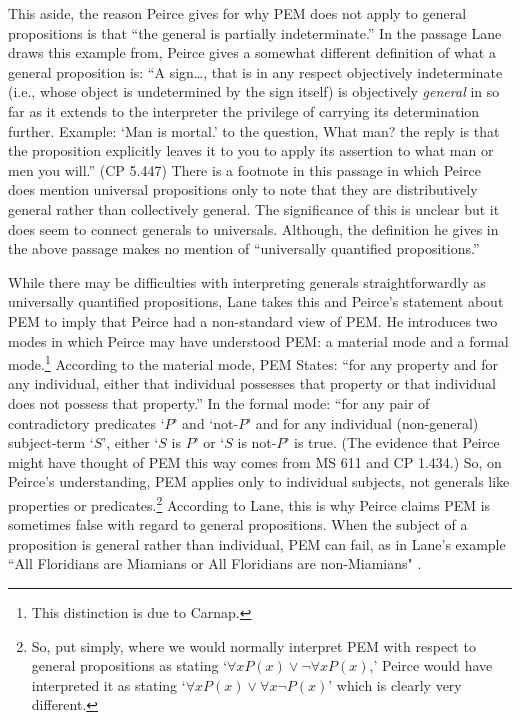 This aside, the reason Peirce gives for why PEM does not apply to general propositions is that ``the general is partially indeterminate.'' In the passage Lane draws this example from, Peirce gives a somewhat different definition of what a general proposition is: ``A sign\dots, that is in any respect objectively indeterminate (i.e., whose object is undetermined by the sign itself) is objectively \textit{general} in so far as it extends to the interpreter the privilege of carrying its determination further. Example: `Man is mortal.' to the question, What man? the reply is that the proposition explicitly leaves it to you to apply its assertion to what man or men you will.'' (CP 5.447) There is a footnote in this passage in which Peirce does mention universal propositions only to note that they are distributively general rather than collectively general. The significance of this is unclear but it does seem to connect generals to universals. Although, the definition he gives in the above passage makes no mention of ``universally quantified propositions.'' 

While there may be difficulties with interpreting generals straightforwardly as universally quantified propositions, Lane takes this and Peirce's statement about PEM to imply that Peirce had a non-standard view of PEM. He introduces two modes in which Peirce may have understood PEM: a material mode and a formal mode.\footnote{This distinction is due to Carnap.} According to the material mode, PEM States: ``for any property and for any individual, either that individual possesses that property or that individual does not possess that property.'' In the formal mode: ``for any pair of contradictory predicates `$P$' and `not-$P$' and for any individual (non-general) subject-term `$S$', either `$S$ is $P$' or `$S$ is not-$P$' is true. (The evidence that Peirce might have thought of PEM this way comes from MS 611 and CP 1.434.) So, on Peirce's understanding, PEM applies only to individual subjects, not generals like properties or predicates.\footnote{So, put simply, where we would normally interpret PEM with respect to general propositions as stating `$\forall x P(x) \lor \neg \forall x P(x)$,' Peirce would have interpreted it as stating `$\forall x P(x) \lor \forall x \neg P(x)$' which is clearly very different.} According to Lane, this is why Peirce claims PEM is sometimes false with regard to general propositions. When the subject of a proposition is general rather than individual, PEM can fail, as in Lane's example ``All Floridians are Miamians or All Floridians are non-Miamians" \citep{lane_peirces_1999}.

